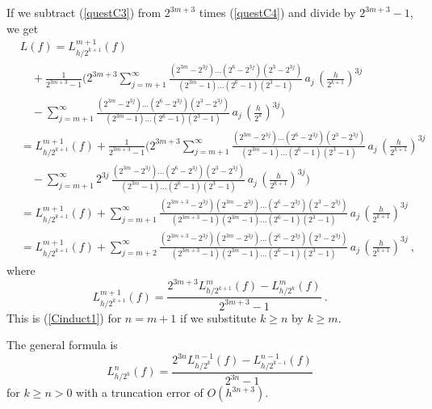 {If we subtract (\ref{questC3}) from $2^{3m+3}$ times (\ref{questC4})
and divide by $2^{3m+3}-1$, we get
\begin{align*}
&L(f) = L_{h/2^{k+1}}^{m+1}(f) \\
&\quad + \frac{1}{2^{3m+3}-1}
\bigg( 2^{3m+3} \sum_{j=m+1}^\infty
\frac{(2^{3m}-2^{3j}) \ldots (2^6-2^{3j})(2^3-2^{3j})}
{(2^{3m}-1)\ldots(2^6-1)(2^3-1)}\, a_j\, \left(\frac{h}{2^{k+1}}\right)^{3j} \\
&\quad -\sum_{j=m+1}^\infty
\frac{(2^{3m}-2^{3j}) \ldots (2^6-2^{3j})(2^3-2^{3j})}
{(2^{3m}-1)\ldots(2^6-1)(2^3-1)}\, a_j\, \left(\frac{h}{2^k}\right)^{3j}
\bigg) \\
&= L_{h/2^{k+1}}^{m+1}(f) + \frac{1}{2^{3m+3}-1}
\bigg( 2^{3m+3} \sum_{j=m+1}^\infty
\frac{(2^{3m}-2^{3j}) \ldots (2^6-2^{3j})(2^3-2^{3j})}
{(2^{3m}-1)\ldots(2^6-1)(2^3-1)}\, a_j\, \left(\frac{h}{2^{k+1}}\right)^{3j} \\
& \quad -\sum_{j=m+1}^\infty
2^{3j} \,\frac{(2^{3m}-2^{3j}) \ldots (2^6-2^{3j})(2^3-2^{3j})}
{(2^{3m}-1)\ldots(2^6-1)(2^3-1)}\, a_j\, \left(\frac{h}{2^{k+1}}\right)^{3j}
\bigg) \\
&= L_{h/2^{k+1}}^{m+1}(f) + \sum_{j=m+1}^\infty
\frac{(2^{3m+3} - 2^{3j})(2^{3m}-2^{3j}) \ldots (2^6-2^{3j})(2^3-2^{3j})}
{(2^{3m+3}-1)(2^{3m}-1)\ldots(2^6-1)(2^3-1)}\,
a_j\, \left(\frac{h}{2^{k+1}}\right)^{3j} \\
&= L_{h/2^{k+1}}^{m+1}(f) + \sum_{j=m+2}^\infty
\frac{(2^{3m+3} - 2^{3j})(2^{3m}-2^{3j}) \ldots (2^6-2^{3j})(2^3-2^{3j})}
{(2^{3m+3}-1)(2^{3m}-1)\ldots(2^6-1)(2^3-1)}\,
 a_j\, \left(\frac{h}{2^{k+1}}\right)^{3j} \ ,
\end{align*}
where
\[
L_{h/2^{k+1}}^{m+1}(f) = \frac{2^{3m+3}L_{h/2^{k+1}}^m(f)-L_{h/2^k}^m(f)}
{2^{3m+3}-1} \ .
\]
This is (\ref{Cinduct1}) for $n=m+1$ if we substitute
$k \geq n$ by $k\geq m$.

The general formula is
\[
L_{h/2^k}^n(f) = \frac{2^{3n} L_{h/2^k}^{n-1}(f) -
  L_{h/2^{k-1}}^{n-1}(f)}{2^{3n} -1}
\]
for $k \geq n > 0$ with a truncation error of $O(h^{3n+3})$.
}

